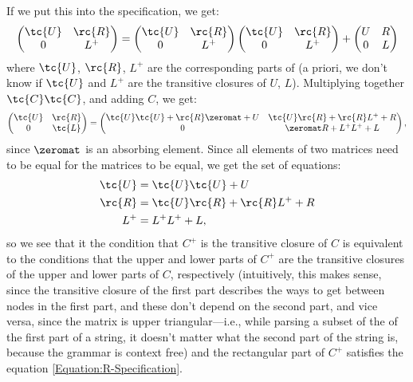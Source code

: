 If we put this into the specification, we get:
\begin{equation*}
  \begin{pmatrix}
    \tc{U} & \rc{R} \\
    0   & L^+
  \end{pmatrix}
  =  
  \begin{pmatrix}
    \tc{U} & \rc{R} \\
    0   & L^+
  \end{pmatrix}
  \begin{pmatrix}
    \tc{U} & \rc{R} \\
    0   & L^+
  \end{pmatrix}
  +
  \begin{pmatrix}
    U & R \\
    0 & L
  \end{pmatrix}
\end{equation*}
where $\tc{U}$, $\rc{R}$, $L^+$ are the corresponding parts of (a priori, we don't know if $\tc{U}$ and $L^+$ are the transitive closures of $U$, $L$). Multiplying together $\tc{C}\tc{C}$, and adding $C$, we get:
\begin{equation*}
    \begin{pmatrix}
    \tc{U} & \rc{R} \\
    0   & \tc{L}
  \end{pmatrix} 
    =
  \begin{pmatrix}
    \tc{U}\tc{U} + \rc{R}\zeromat + U   &   \tc{U}\rc{R}     + \rc{R}L^+ + R \\
    0                          &   \zeromat R + L^+L^+ + L
  \end{pmatrix}
  ,
\end{equation*}
since $\zeromat$ is an absorbing element. Since all elements of two matrices need to be equal for the matrices to be equal, we get the set of equations:
\begin{align}
  \tc{U} &= \tc{U}\tc{U} + U \\
  \rc{R} &= \tc{U}\rc{R} + \rc{R}L^+ + R \label{Equation:R-Specification}\\
  L^+ &= L^+L^+ + L,
\end{align}
so we see that it the condition that $C^+$ is the transitive closure of $C$ is equivalent to the conditions that the upper and lower parts of $C^+$ are the transitive closures of the upper and lower parts of $C$, respectively (intuitively, this makes sense, since the transitive closure of the first part describes the ways to get between nodes in the first part, and these don't depend on the second part, and vice versa, since the matrix is upper triangular---i.e., while parsing a subset of the of the first part of a string, it doesn't matter what the second part of the string is, because the grammar is context free) and the rectangular part of $C^+$ satisfies the equation \eqref{Equation:R-Specification}.

